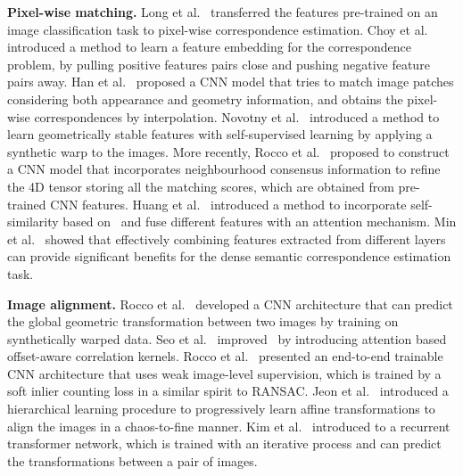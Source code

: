 \documentclass[10pt,twocolumn,letterpaper]{article}
\begin{document}
\noindent
\textbf{Pixel-wise matching.}\enspace
Long et al.~\cite{Long2014doconv} transferred the features pre-trained on an image classification task to pixel-wise correspondence estimation.
Choy et al.~\cite{Choy_NIPS16_UCN} introduced a method to learn a feature embedding for the correspondence problem, by pulling positive features pairs close and pushing negative feature pairs away.
Han et al.~\cite{han2017scnet} proposed a CNN model that tries to match image patches considering both appearance and geometry information, and obtains the pixel-wise correspondences by interpolation.
Novotny et al.~\cite{Novotn2018selfsuper} introduced a method to learn geometrically stable features with self-supervised learning by applying a synthetic warp to the images.
More recently, Rocco et al.~\cite{Rocco_NIPS18_NCNet} proposed to construct a CNN model that incorporates neighbourhood consensus information to refine the 4D tensor storing all the matching scores, which are obtained from pre-trained CNN features.
Huang et al.~\cite{Huang_ICCV19_DCCNet} introduced a method to incorporate self-similarity based on~\cite{Rocco_NIPS18_NCNet} and fuse different features with an attention mechanism.
Min et al.~\cite{min2019hyperpixel} showed that effectively combining features extracted from different layers can provide significant benefits for the dense semantic correspondence estimation task.

\noindent
\textbf{Image alignment.}
Rocco et al.~\cite{Rocco17} developed a CNN architecture that can predict the global geometric transformation between two images by training on synthetically warped data.
Seo et al.~\cite{paul2018attentive} improved~\cite{Rocco17} by introducing attention based offset-aware correlation kernels.
Rocco et al.~\cite{Rocco_CVPR18_WeakAlign} presented an end-to-end trainable CNN architecture that uses weak image-level supervision, which is trained by a soft inlier counting loss in a similar spirit to RANSAC.
Jeon et al.~\cite{Jeon2018parn} introduced a hierarchical learning procedure to progressively learn affine transformations to align the images in a chaos-to-fine manner.
Kim et al.~\cite{Kim_NIPS18_RTNet} introduced to a recurrent transformer network, which is trained with an iterative process and can predict the transformations between a pair of images. 
\end{document}
